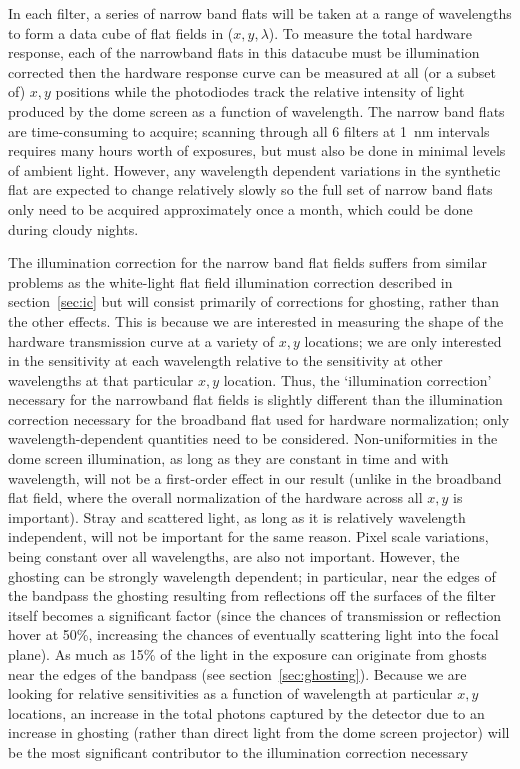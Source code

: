 \documentclass[12pt,preprint]{aastex}
\begin{document}
In each filter, a series of narrow band flats will be taken at a range
of wavelengths to form a data cube of flat fields in ($x,y,\lambda$).
To measure the total hardware response, each of the narrowband flats
in this datacube must be illumination corrected then the hardware
response curve can be measured at all (or a subset of) $x,y$ positions
while the photodiodes track the relative intensity of light produced
by the dome screen as a function of wavelength.  The narrow band flats
are time-consuming to acquire; scanning through all 6 filters at 1~nm
intervals requires many hours worth of exposures, but must also be
done in minimal levels of ambient light. However, any wavelength
dependent variations in the synthetic flat are expected to change
relatively slowly so the full set of narrow band flats only need to be
acquired approximately once a month, which could be done during cloudy
nights.


The illumination correction for the narrow band flat fields suffers
from similar problems as the white-light flat field illumination
correction described in section~\ref{sec:ic} but will consist
primarily of corrections for ghosting, rather than the other
effects. This is because we are interested in measuring the shape of
the hardware transmission curve at a variety of $x,y$ locations; we
are only interested in the sensitivity at each wavelength relative to
the sensitivity at other wavelengths at that particular $x,y$
location. Thus, the `illumination correction' necessary for the
narrowband flat fields is slightly different than the illumination
correction necessary for the broadband flat used for hardware
normalization; only wavelength-dependent quantities need to be
considered. Non-uniformities in the dome screen illumination, as long as
they are constant in time and with wavelength, will not be a
first-order effect in our result (unlike in the broadband flat field,
where the overall normalization of the hardware across all $x,y$ is
important).  Stray and scattered light, as long as it is relatively
wavelength independent, will not be important for the same
reason. Pixel scale variations, being constant over all wavelengths,
are also not important.  However, the ghosting can be strongly wavelength dependent; in
particular, near the edges of the bandpass the ghosting resulting from
reflections off the surfaces of the filter itself becomes a
significant factor (since the chances of transmission or reflection
hover at 50\%, increasing the chances of eventually scattering light
into the focal plane). As much as 15\% of the light in the exposure
can originate from ghosts near the edges of the bandpass
\citep{Stubbs2010a} (see section~\ref{sec:ghosting}). Because we are
looking for relative sensitivities as a function of wavelength at
particular $x,y$ locations, an increase in the total photons captured
by the detector due to an increase in ghosting (rather than direct
light from the dome screen projector) will be the most significant
contributor to the illumination correction necessary 
\end{document}
